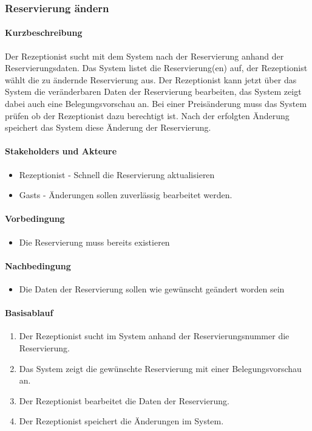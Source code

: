 \subsubsection{Reservierung ändern}

\paragraph{Kurzbeschreibung}
Der \Gls{Rezeptionist} sucht mit dem System nach der \Gls{Reservierung} anhand der Reservierungsdaten. Das System listet die \Gls{Reservierung}(en) auf,  der \Gls{Rezeptionist} wählt die zu ändernde \Gls{Reservierung} aus. Der \Gls{Rezeptionist} kann jetzt über das System die veränderbaren Daten der \Gls{Reservierung} bearbeiten, das System zeigt dabei auch eine \Gls{Belegungsvorschau} an. Bei einer Preisänderung muss das System prüfen ob der \Gls{Rezeptionist} dazu berechtigt ist. Nach der erfolgten Änderung speichert das System diese Änderung der \Gls{Reservierung}.

\paragraph{Stakeholders und Akteure}
\begin{itemize}
	\item \Gls{Rezeptionist} - Schnell die Reservierung aktualisieren
	\item \Glspl{Gast} - Änderungen sollen zuverlässig bearbeitet werden.
\end{itemize}

\paragraph{Vorbedingung}
\begin{itemize}
	\item Die Reservierung muss bereits existieren
\end{itemize}

\paragraph{Nachbedingung}
\begin{itemize}
	\item Die Daten der Reservierung sollen wie gewünscht geändert worden sein
\end{itemize}

\paragraph{Basisablauf}
\begin{enumerate}
	\item Der \Gls{Rezeptionist} sucht im System anhand der \Gls{Reservierungsnummer} die \Gls{Reservierung}.
	\item Das System zeigt die gewünschte \Gls{Reservierung} mit einer Belegungsvorschau an.
	\item Der \Gls{Rezeptionist} bearbeitet die Daten der Reservierung.
	\item Der \Gls{Rezeptionist} speichert die Änderungen im System.
\end{enumerate}


